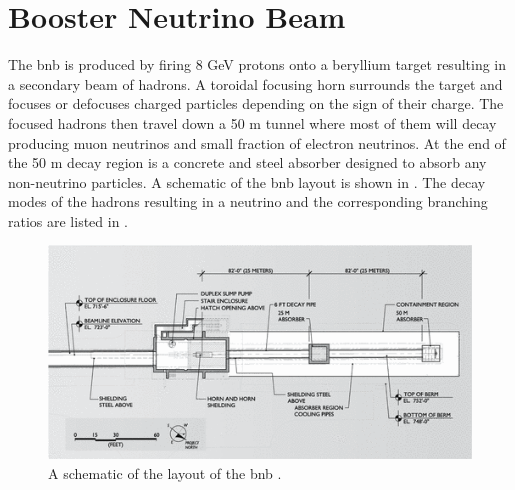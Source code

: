 \section{Booster Neutrino Beam}\label{sec:BNB}
The \gls{bnb} is produced by firing 8 GeV protons onto a beryllium target resulting in a secondary beam of hadrons. A toroidal focusing horn surrounds the target and focuses or defocuses charged particles depending on the sign of their charge. The focused hadrons then travel down a 50 m tunnel where most of them will decay producing muon neutrinos and small fraction of electron neutrinos. At the end of the 50 m decay region is a concrete and steel absorber designed to absorb any non-neutrino particles. A schematic of the \gls{bnb} layout is shown in . The decay modes of the hadrons resulting in a neutrino and the corresponding branching ratios are listed in . 

\begin{figure}
    \centering
    \includegraphics[width =\largefigwidth]{figures-chap3/BNB_schematic.png}
    \caption[Schematic of the BNB layout.]{A schematic of the layout of the \gls{bnb} \cite{BNB_flux}.}
    \label{fig: BNB schematic}
\end{figure}

